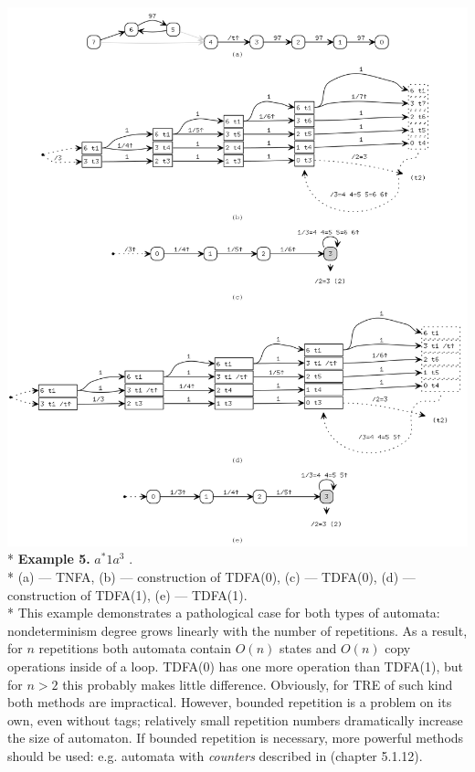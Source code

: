\documentclass{article}
\newenvironment{Xfig}
    {\par\medskip\noindent\minipage{\linewidth}\begin{center}}
    {\end{center}\endminipage\par\medskip}
\theoremstyle{definition}
\begin{document}
\begin{Xfig}
\includegraphics[width=0.9\linewidth]{img/example3_all.png}\\*
\textbf{Example 5.} $a^* 1 a^{3}$ .\\*
(a) --- TNFA, (b) --- construction of TDFA(0), (c) --- TDFA(0), (d) --- construction of TDFA(1), (e) --- TDFA(1).\\*
This example demonstrates a pathological case for both types of automata:
nondeterminism degree grows linearly with the number of repetitions.
As a result, for $n$ repetitions both automata contain $O(n)$ states and $O(n)$ copy operations inside of a loop.
TDFA(0) has one more operation than TDFA(1), but for $n \!>\! 2$ this probably makes little difference.
Obviously, for TRE of such kind both methods are impractical.
However, bounded repetition is a problem on its own, even without tags;
relatively small repetition numbers dramatically increase the size of automaton.
If bounded repetition is necessary, more powerful methods should be used:
e.g. automata with \emph{counters} described in \cite{Bec09} (chapter 5.1.12).
\end{Xfig}
\end{document}
